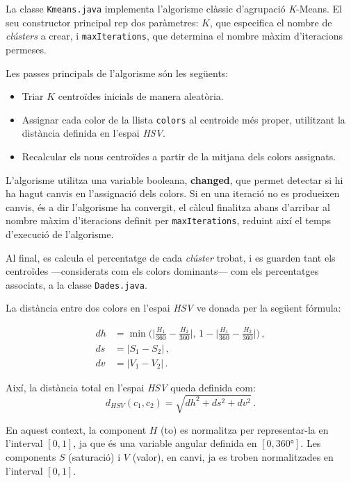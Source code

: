 \documentclass{ieeetj}
\begin{document}
La classe \texttt{Kmeans.java} implementa l'algorisme clàssic d'agrupació \emph{K}-Means\cite{KMeans}. El seu constructor principal rep dos paràmetres: \(K\), que especifica el nombre de \emph{clústers} a crear, i \texttt{maxIterations}, que determina el nombre màxim d'iteracions permeses.\newline

Les passes principals de l'algorisme són les següents:
\begin{itemize}
    \item Triar \(K\) centroïdes inicials de manera aleatòria.
    \item Assignar cada color de la llista \texttt{colors} al centroide més proper, utilitzant la distància definida en l'espai \emph{HSV}.
    \item Recalcular els nous centroïdes a partir de la mitjana dels colors assignats.
\end{itemize}

L'algorisme utilitza una variable booleana, \textbf{changed}, que permet detectar si hi ha hagut canvis en l'assignació dels colors. Si en una iteració no es produeixen canvis, és a dir l'algorisme ha convergit, el càlcul finalitza abans d'arribar al nombre màxim d'iteracions definit per \texttt{maxIterations}, reduint així el temps d'execució de l'algorisme.\newline

Al final, es calcula el percentatge de cada \emph{clúster} trobat, i es guarden tant els centroïdes —considerats com els colors dominants— com els percentatges associats, a la classe \texttt{Dades.java}.\newline

La distància entre dos colors en l'espai \emph{HSV} ve donada per la següent fórmula:

\[
\begin{aligned}
dh &= \min\Big(\big| \tfrac{H_1}{360} - \tfrac{H_2}{360} \big|,\, 
           1 - \big| \tfrac{H_1}{360} - \tfrac{H_2}{360} \big| \Big) \,, \\
ds &= |S_1 - S_2| \,, \\
dv &= |V_1 - V_2| \,. 
\end{aligned}
\]

Així, la distància total en l’espai \emph{HSV} queda definida com:
\[
d_\mathit{HSV}(c_1, c_2) = \sqrt{dh^2 + ds^2 + dv^2}\,.
\]


En aquest context, la component \(H\) (to) es normalitza per representar-la en l'interval \([0,1]\), ja que és una variable angular definida en \([0,360°]\). Les components \(S\) (saturació) i \(V\) (valor), en canvi, ja es troben normalitzades en l'interval \([0,1]\).
\end{document}
